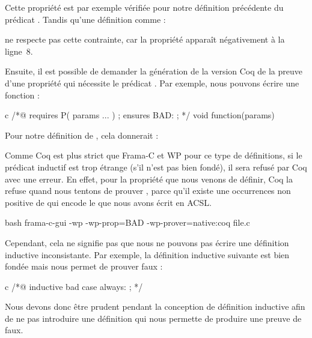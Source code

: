 Cette propriété est par exemple vérifiée pour notre définition précédente du
prédicat . Tandis qu'une définition comme :




ne respecte pas cette contrainte, car la propriété 
apparaît négativement à la ligne~8.


Ensuite, il est possible de demander la génération de la version Coq de la
preuve d'une propriété qui nécessite le prédicat . Par exemple,
nous pouvons écrire une fonction :



\begin{CodeBlock}{c}
/*@
  requires P( params ... ) ;
  ensures  BAD: \false ;
*/ void function(params){

}
\end{CodeBlock}


Pour notre définition de , cela donnerait :




Comme Coq est plus strict que Frama-C et WP pour ce type de définitions, si
le prédicat inductif est trop étrange (s'il n'est pas bien fondé), il sera
refusé par Coq avec une erreur. En effet, pour la propriété
 que nous venons de définir, Coq la refuse quand
nous tentons de prouver , parce
qu'il existe une occurrences non positive de 
qui encode le  que nous avons écrit en ACSL.

\begin{CodeBlock}{bash}
frama-c-gui -wp -wp-prop=BAD -wp-prover=native:coq file.c
\end{CodeBlock}




Cependant, cela ne signifie pas que nous ne pouvons pas écrire une définition
inductive inconsistante. Par exemple, la définition inductive suivante est bien
fondée mais nous permet de prouver faux :


\begin{CodeBlock}{c}
/*@
  inductive bad {
    case always: \false ;
  }
*/
\end{CodeBlock}


Nous devons donc être prudent pendant la conception de définition inductive afin
de ne pas introduire une définition qui nous permette de produire une preuve de
faux.


